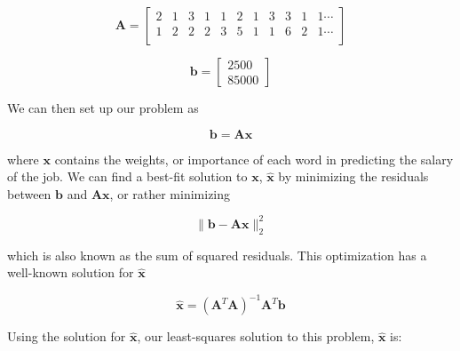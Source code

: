 \documentclass[12pt]{article}
\begin{document}
    \begin{equation*}
        \bm{A} = 
        \begin{bmatrix}
            2 & 1 & 3 & 1 & 1 & 2 & 1 & 3 & 3 & 1 & 1 \cdots \\
            1 & 2 & 2 & 2 & 3 & 5 & 1 & 1 & 6 & 2 & 1 \cdots \\
        \end{bmatrix}
    \end{equation*}


    \begin{equation*}
        \bm{b} = 
        \begin{bmatrix}
        2500\\
        85000
        \end{bmatrix}
    \end{equation*}

    We can then set up our problem as 

    \begin{equation}\label{eq:linsolve}
        \bm{b} = \bm{Ax}
    \end{equation}

    \noindent where $\bm{x}$ contains the weights, or importance of each word
    in predicting the salary of the job. We can find a best-fit solution to
    $\bm{x}$, $\bm{\hat{x}}$ by minimizing the residuals between $\bm{b}$ and
    $\bm{Ax}$, or rather minimizing

    \begin{equation}
        \|\bm{b} - \bm{Ax}\|^2_2
    \end{equation}

    \noindent which is also known as the sum of squared residuals. This
    optimization has a well-known solution for $\bm{\hat{x}}$

    \begin{equation}
        \bm{\hat{x}} = (\bm{A}^{T}\bm{A})^{-1}\bm{A}^T\bm{b}
    \end{equation}

    Using the solution for $\bm{\hat{x}}$, our least-squares solution to this
    problem, $\bm{\hat{x}}$ is:

\end{document}
